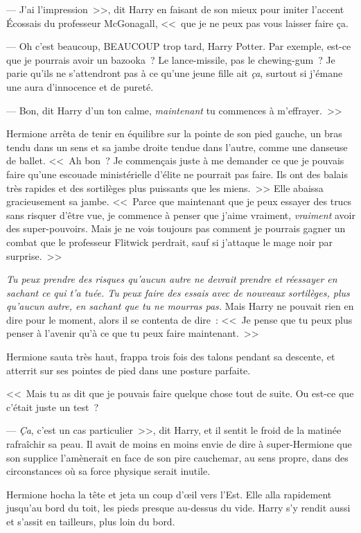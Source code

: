 --- J'ai l'impression~>>, dit Harry en faisant de son mieux pour imiter l'accent Écossais du professeur McGonagall, <<~que je ne peux pas vous laisser faire ça.

--- Oh c'est beaucoup, BEAUCOUP trop tard, Harry Potter. Par exemple, est-ce que je pourrais avoir un bazooka~? Le lance-missile, pas le chewing-gum~? Je parie qu'ils ne s'attendront pas à ce qu'une jeune fille ait \emph{ça}, surtout si j'émane une aura d'innocence et de pureté.

--- Bon, dit Harry d'un ton calme, \emph{maintenant} tu commences à m'effrayer.~>>

Hermione arrêta de tenir en équilibre sur la pointe de son pied gauche, un bras tendu dans un sens et sa jambe droite tendue dans l'autre, comme une danseuse de ballet. <<~Ah bon~? Je commençais juste à me demander ce que je pouvais faire qu'une escouade ministérielle d'élite ne pourrait pas faire. Ils ont des balais très rapides et des sortilèges plus puissants que les miens.~>> Elle abaissa gracieusement sa jambe. <<~Parce que maintenant que je peux essayer des trucs sans risquer d'être vue, je commence à penser que j'aime vraiment, \emph{vraiment} avoir des super-pouvoirs. Mais je ne vois toujours pas comment je pourrais gagner un combat que le professeur Flitwick perdrait, sauf si j'attaque le mage noir par surprise.~>>

\emph{Tu peux prendre des risques qu'aucun autre ne devrait prendre et réessayer en sachant ce qui t'a tuée. Tu peux faire des essais avec de nouveaux sortilèges, plus qu'aucun autre, en sachant que tu ne mourras pas.} Mais Harry ne pouvait rien en dire pour le moment, alors il se contenta de dire~: <<~Je pense que tu peux plus penser à l'avenir qu'à ce que tu peux faire maintenant.~>>

Hermione sauta très haut, frappa trois fois des talons pendant sa descente, et atterrit sur ses pointes de pied dans une posture parfaite.

<<~Mais tu as dit que je pouvais faire quelque chose tout de suite. Ou est-ce que c'était juste un test~?

--- \emph{Ça}, c'est un cas particulier~>>, dit Harry, et il sentit le froid de la matinée rafraîchir sa peau. Il avait de moins en moins envie de dire à super-Hermione que son supplice l'amènerait en face de son pire cauchemar, au sens propre, dans des circonstances où sa force physique serait inutile.

Hermione hocha la tête et jeta un coup d'œil vers l'Est. Elle alla rapidement jusqu'au bord du toit, les pieds presque au-dessus du vide. Harry s'y rendit aussi et s'assit en tailleurs, plus loin du bord.

